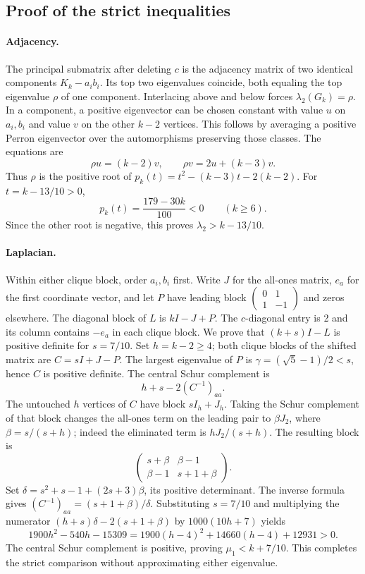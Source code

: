 \documentclass[11pt,a4paper]{article}
\begin{document}
\subsection{Proof of the strict inequalities}
\paragraph{Adjacency.}
The principal submatrix after deleting \(c\) is the adjacency matrix
of two identical components \(K_k-a_ib_i\). Its top two eigenvalues
coincide, both equaling the top eigenvalue \(\rho\) of one component.
Interlacing above and below forces \(\lambda_2(G_k)=\rho\).
In a component, a positive eigenvector can be chosen constant with
value \(u\) on \(a_i,b_i\) and value \(v\) on the other \(k-2\)
vertices. This follows by averaging a positive Perron eigenvector
over the automorphisms preserving those classes. The equations are
\[
   \rho u=(k-2)v,\qquad
   \rho v=2u+(k-3)v.
\]
Thus \(\rho\) is the positive root of
\(p_k(t)=t^2-(k-3)t-2(k-2)\).
For \(t=k-13/10>0\),
\[
  p_k(t)=\frac{179-30k}{100}<0\qquad(k\geq6).
\]
Since the other root is negative, this proves \(\lambda_2>k-13/10\).

\paragraph{Laplacian.}
Within either clique block, order \(a_i,b_i\) first. Write \(J\)
for the all-ones matrix, \(e_a\) for the first coordinate vector,
and let \(P\) have leading block
\(\left(\begin{smallmatrix}0&1\\1&-1\end{smallmatrix}\right)\)
and zeros elsewhere. The diagonal block of \(L\) is \(kI-J+P\).
The \(c\)-diagonal entry is 2 and its column contains \(-e_a\)
in each clique block. We prove that \((k+s)I-L\) is positive
definite for \(s=7/10\). Set \(h=k-2\geq4\); both clique blocks
of the shifted matrix are \(C=sI+J-P\). The largest eigenvalue of
\(P\) is \(\gamma=(\sqrt5-1)/2<s\), hence \(C\) is positive
definite. The central Schur complement is
\[
    h+s-2(C^{-1})_{aa}.
\]
The untouched \(h\) vertices of \(C\) have block \(sI_h+J_h\).
Taking the Schur complement of that block changes the all-ones
term on the leading pair to \(\beta J_2\), where
\(\beta=s/(s+h)\); indeed the eliminated term is
\(hJ_2/(s+h)\). The resulting block is
\[
   \begin{pmatrix}s+\beta&\beta-1\\ \beta-1&s+1+\beta\end{pmatrix}.
\]
Set \(\delta=s^2+s-1+(2s+3)\beta\), its positive determinant.
The inverse formula gives \((C^{-1})_{aa}=(s+1+\beta)/\delta\).
Substituting \(s=7/10\) and multiplying the numerator
\((h+s)\delta-2(s+1+\beta)\) by \(1000(10h+7)\) yields
\[
  1900h^2-540h-15309
   =1900(h-4)^2+14660(h-4)+12931>0.
\]
The central Schur complement is positive, proving
\(\mu_1<k+7/10\). This completes the strict comparison without
approximating either eigenvalue.
\end{document}
